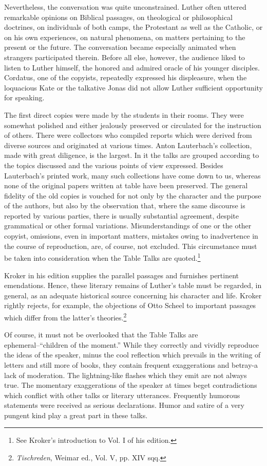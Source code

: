Nevertheless, the conversation was quite unconstrained. Luther
often uttered remarkable opinions on Biblical passages, on theological
or philosophical doctrines, on individuals of both camps, the Protestant
as well as the Catholic, or on his own experiences, on natural
phenomena, on matters pertaining to the present or the future. The
conversation became especially animated when strangers participated
therein. Before all else, however, the audience liked to listen to Luther
himself, the honored and admired oracle of his younger disciples.
Cordatus, one of the copyists, repeatedly expressed his displeasure,
when the loquacious Kate or the talkative Jonas did not allow Luther
sufficient opportunity for speaking.

The first direct copies were made by the students in their rooms. They
were somewhat polished and either jealously preserved or circulated for the
instruction of others. There were collectors who compiled reports which
were derived from diverse sources and originated at various times. Anton
Lauterbach’s collection, made with great diligence, is the largest. In it the
talks are grouped according to the topics discussed and the various points of
view expressed. Besides Lauterbach’s printed work, many such collections
have come down to us, whereas none of the original papers written at table
have been preserved. The general fidelity of the old copies is vouched for not
only by the character and the purpose of the authors, but also by the observation
that, where the same discourse is reported by various parties, there is
usually substantial agreement, despite grammatical or other formal variations.
Misunderstandings of one or the other copyist, omissions, even in important
matters, mistakes owing to inadvertence in the course of reproduction, are, of
course, not excluded. This circumstance must be taken into consideration
when the Table Talks are quoted.\footnote{See Kroker’s introduction to Vol. I of his edition.}


Kroker in his edition supplies the parallel passages and furnishes pertinent
emendations. Hence, these literary remains of Luther’s table must be regarded,
in general, as an adequate historical source concerning his character
and life. Kroker rightly rejects, for example, the objections of Otto
Scheel to important passages which differ from the latter’s theories.\footnote{\textit{Tischreden}, Weimar ed., Vol. V, pp. XIV sqq.}


Of course, it must not be overlooked that the Table Talks are
ephemeral--“children of the moment.” While they correctly and
vividly reproduce the ideas of the speaker, minus the cool reflection
which prevails in the writing of letters and still more of books, they
contain frequent exaggerations and betray-a lack of moderation. The
lightning-like flashes which they emit are not always true. The momentary
exaggerations of the speaker at times beget contradictions
which conflict with other talks or literary utterances. Frequently humorous
statements were received as serious declarations. Humor and
satire of a very pungent kind play a great part in these talks.


